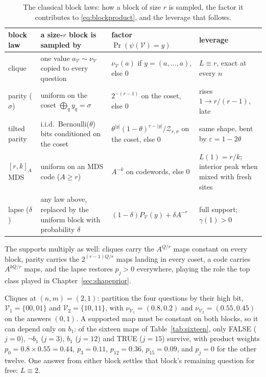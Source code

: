 \documentclass[11pt]{article}
\begin{document}
\begin{table}[H]
\begin{center}
\begin{tabular}{l p{3.6cm} p{4.0cm} p{3.1cm}}
\toprule
block law & a size-$r$ block is sampled by &
  factor $\Pr(\psi(\mathcal V) = y)$ & leverage \\
\midrule
clique & one value $a_{\mathcal V}\sim\nu_{\mathcal V}$ copied to
  every question &
  $\nu_{\mathcal V}(a)$ if $y = (a,\ldots,a)$, else $0$ &
  $L \equiv r$, exact at every $n$ \\
parity ($\sigma$) & uniform on the coset
  $\bigoplus_q y_q = \sigma$ &
  $2^{-(r-1)}$ on the coset, else $0$ &
  rises $1 \to r/(r-1)$, late \\
tilted parity & i.i.d.\ Bernoulli($\theta$) bits conditioned on the
  coset &
  $\theta^{|y|}(1-\theta)^{r-|y|}/\mathcal Z_{r,\sigma}$ on the coset,
  else $0$ &
  same shape, bent by $\varepsilon = 1-2\theta$ \\
$[r,k]_A$ MDS & uniform on an MDS code ($A \ge r$) &
  $A^{-k}$ on codewords, else $0$ &
  $L(1) = r/k$; interior peak when mixed with fresh sites \\
lapse ($\delta$) & any law above, replaced by the uniform block with
  probability $\delta$ &
  $(1-\delta)P_{\mathcal V}(y) + \delta A^{-r}$ &
  full support; $\gamma(1) > 0$ \\
\bottomrule
\end{tabular}
\end{center}
\caption{The classical block laws: how a block of size $r$ is sampled, the factor it contributes to \eqref{eq:blockproduct}, and the leverage that follows.}
\label{tab:blocklaws}
\end{table}

The supports multiply as well: cliques carry the $A^{Q/r}$ maps
constant on every block, parity carries the $2^{(r-1)Q/r}$ maps
landing in every coset, a code carries $A^{kQ/r}$ maps, and the
lapse restores $p_j > 0$ everywhere, playing the role the top class
played in Chapter~\ref{sec:shapeprior}.

\begin{example}
Cliques at $(n,m) = (2,1)$: partition the four questions by their
high bit, $\mathcal V_1 = \{00, 01\}$ and
$\mathcal V_2 = \{10, 11\}$, with $\nu_{\mathcal V_1} = (0.8, 0.2)$ and
$\nu_{\mathcal V_2} = (0.55, 0.45)$ on the answers $(0,1)$. A supported map must
be constant on both blocks, so it can depend only on $b_1$: of the
sixteen maps of Table~\ref{tab:sixteen}, only FALSE ($j = 0$),
$\lnot b_1$ ($j = 3$), $b_1$ ($j = 12$) and TRUE ($j = 15$) survive,
with product weights
$p_0 = 0.8 \times 0.55 = 0.44$,
$p_3 = 0.11$, $p_{12} = 0.36$, $p_{15} = 0.09$, and $p_j = 0$ for
the other twelve. One answer from either block settles that block's
remaining question for free: $L \equiv 2$.
\end{example}
\end{document}
